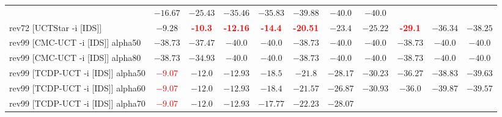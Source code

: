 \documentclass{article}
\begin{document}
\begin{tabular}{|l|r@{$\pm$}rr@{$\pm$}rr@{$\pm$}rr@{$\pm$}rr@{$\pm$}rr@{$\pm$}rr@{$\pm$}rr@{$\pm$}rr@{$\pm$}rr@{$\pm$}r|}
& \multicolumn{2}{c}{$-16.67$}
& \multicolumn{2}{c}{$-25.43$}
& \multicolumn{2}{c}{$-35.46$}
& \multicolumn{2}{c}{$-35.83$}
& \multicolumn{2}{c}{$-39.88$}
& \multicolumn{2}{c}{$-40.0$}
& \multicolumn{2}{c|}{$-40.0$}
\\
rev72 [UCTStar -i [IDS]]
& \multicolumn{2}{c}{$-9.28$}
& \multicolumn{2}{c}{\textbf{\textcolor{red}{-10.3}}}
& \multicolumn{2}{c}{\textbf{\textcolor{red}{-12.16}}}
& \multicolumn{2}{c}{\textbf{\textcolor{red}{-14.4}}}
& \multicolumn{2}{c}{\textbf{\textcolor{red}{-20.51}}}
& \multicolumn{2}{c}{$-23.4$}
& \multicolumn{2}{c}{$-25.22$}
& \multicolumn{2}{c}{\textbf{\textcolor{red}{-29.1}}}
& \multicolumn{2}{c}{$-36.34$}
& \multicolumn{2}{c|}{$-38.25$}
\\
\hline
rev99 [CMC-UCT -i [IDS]] alpha50
& \multicolumn{2}{c}{$-38.73$}
& \multicolumn{2}{c}{$-37.47$}
& \multicolumn{2}{c}{$-40.0$}
& \multicolumn{2}{c}{$-40.0$}
& \multicolumn{2}{c}{$-38.73$}
& \multicolumn{2}{c}{$-40.0$}
& \multicolumn{2}{c}{$-40.0$}
& \multicolumn{2}{c}{$-38.73$}
& \multicolumn{2}{c}{$-40.0$}
& \multicolumn{2}{c|}{$-40.0$}
\\
rev99 [CMC-UCT -i [IDS]] alpha80
& \multicolumn{2}{c}{$-38.73$}
& \multicolumn{2}{c}{$-34.93$}
& \multicolumn{2}{c}{$-40.0$}
& \multicolumn{2}{c}{$-40.0$}
& \multicolumn{2}{c}{$-38.73$}
& \multicolumn{2}{c}{$-40.0$}
& \multicolumn{2}{c}{$-40.0$}
& \multicolumn{2}{c}{$-38.73$}
& \multicolumn{2}{c}{$-40.0$}
& \multicolumn{2}{c|}{$-40.0$}
\\
rev99 [TCDP-UCT -i [IDS]] alpha50
& \multicolumn{2}{c}{\textbf{\textcolor{red}{$-9.07$}}}
& \multicolumn{2}{c}{$-12.0$}
& \multicolumn{2}{c}{\textbf{$-12.93$}}
& \multicolumn{2}{c}{$-18.5$}
& \multicolumn{2}{c}{$-21.8$}
& \multicolumn{2}{c}{$-28.17$}
& \multicolumn{2}{c}{$-30.23$}
& \multicolumn{2}{c}{$-36.27$}
& \multicolumn{2}{c}{$-38.83$}
& \multicolumn{2}{c|}{$-39.63$}
\\
rev99 [TCDP-UCT -i [IDS]] alpha60
& \multicolumn{2}{c}{\textbf{\textcolor{red}{$-9.07$}}}
& \multicolumn{2}{c}{$-12.0$}
& \multicolumn{2}{c}{\textbf{$-12.93$}}
& \multicolumn{2}{c}{$-18.4$}
& \multicolumn{2}{c}{$-21.57$}
& \multicolumn{2}{c}{$-26.87$}
& \multicolumn{2}{c}{$-30.93$}
& \multicolumn{2}{c}{$-36.0$}
& \multicolumn{2}{c}{$-39.87$}
& \multicolumn{2}{c|}{$-39.57$}
\\
rev99 [TCDP-UCT -i [IDS]] alpha70
& \multicolumn{2}{c}{\textbf{\textcolor{red}{$-9.07$}}}
& \multicolumn{2}{c}{$-12.0$}
& \multicolumn{2}{c}{\textbf{$-12.93$}}
& \multicolumn{2}{c}{$-17.77$}
& \multicolumn{2}{c}{$-22.23$}
& \multicolumn{2}{c}{$-28.07$}

\end{tabular}
\end{document}
